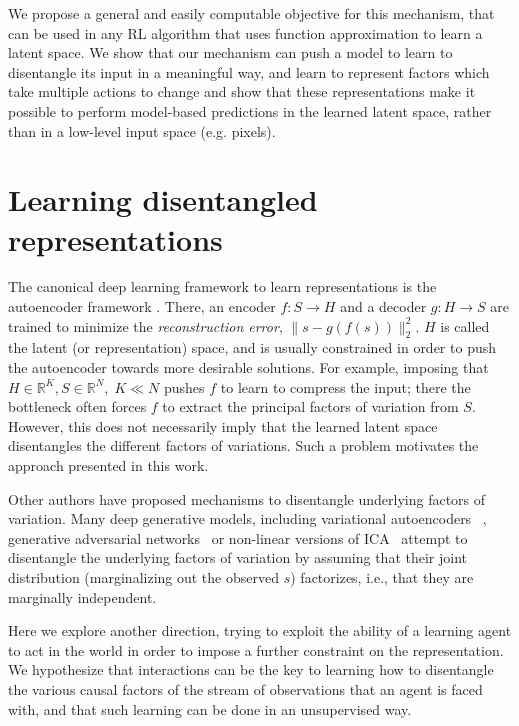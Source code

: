 We propose a general and easily computable objective for this mechanism, that can be used in any RL algorithm that uses function approximation to learn a latent space. We show that our mechanism can push a model to learn to disentangle its input in a meaningful way, and learn to represent factors which take multiple actions to change and show that these representations make it possible to perform model-based predictions in the learned latent space, rather than in a low-level input space (e.g. pixels).

\section{Learning disentangled representations}

The canonical deep learning framework to learn representations is the autoencoder framework \citep{hinton2006reducing}. There, an encoder $f:S\to H$ and a decoder $g:H \to S$ are trained to minimize the \emph{reconstruction error}, $\|s-g(f(s))\|_2^2$. $H$ is called the latent (or representation) space, and is usually constrained in order to push the autoencoder towards more desirable solutions. For example, imposing that $H\in\mathbb{R}^K, S\in\mathbb{R}^N,\; K\ll N$ pushes $f$ to learn to compress the input; there the bottleneck often forces $f$ to extract the principal factors of variation from $S$. However, this does not necessarily imply that the learned latent space disentangles the different factors of variations. Such a problem motivates the approach presented in this work.




Other authors have proposed mechanisms to disentangle underlying factors of variation. Many deep generative models, including variational autoencoders~\citep{Kingma+Welling-ICLR2014} , generative adversarial
networks~\citep{Goodfellow-et-al-NIPS2014} or non-linear versions of ICA~\citep{Dinh-et-al-2014,Hyvarinen+Morioka-NIPS2016} attempt to disentangle the underlying factors of variation by assuming that their joint distribution (marginalizing out the observed $s$) factorizes, i.e., that they are marginally independent.

Here we explore another direction, trying to exploit the ability of a learning agent to act in the world in order to impose a further constraint on the representation. We hypothesize that interactions can be the key to learning how to disentangle the various causal factors of the stream of observations that an agent is faced with, and that such learning can be done in an unsupervised way. %







